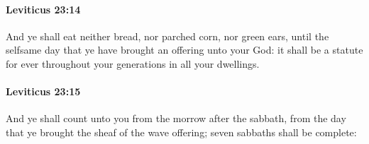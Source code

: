 		\paragraph{Leviticus 23:14} %
			\label{LEVITICUS-23-14}

			And ye shall eat neither bread, nor parched corn, nor green ears, until the selfsame day that ye have brought an offering unto your God: it shall be a statute for ever throughout your generations in all your dwellings.


		\paragraph{Leviticus 23:15} %
			\label{LEVITICUS-23-15}

			And ye shall count unto you from the morrow after the sabbath, from the day that ye brought the sheaf of the wave offering; seven sabbaths shall be complete:

